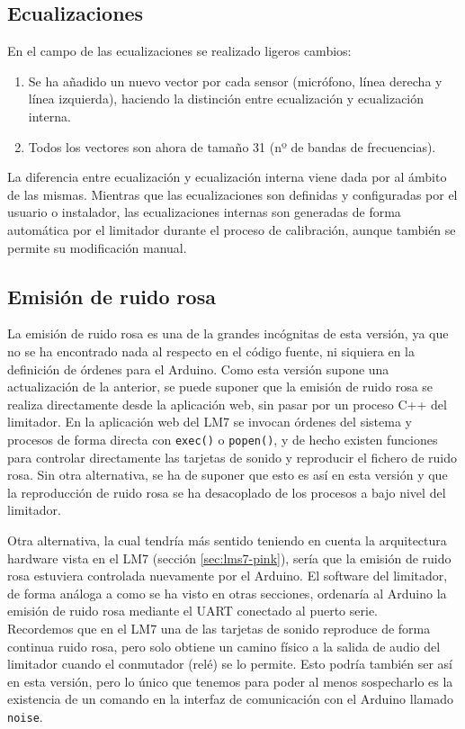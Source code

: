 \subsection{Ecualizaciones} \label{sec:lms11-eq}

En el campo de las ecualizaciones se realizado ligeros cambios:
\begin{enumerate}
	\item Se ha añadido un nuevo vector por cada sensor (micrófono, línea derecha y línea izquierda), haciendo la distinción entre ecualización y ecualización interna.

	\item Todos los vectores son ahora de tamaño 31 (nº de bandas de frecuencias).
\end{enumerate}

La diferencia entre ecualización y ecualización interna viene dada por al ámbito de las mismas. Mientras que las ecualizaciones son definidas y configuradas por el usuario o instalador, las ecualizaciones internas son generadas de forma automática por el limitador durante el proceso de calibración, aunque también se permite su modificación manual.

\subsection{Emisión de ruido rosa}

La emisión de ruido rosa es una de la grandes incógnitas de esta versión, ya que no se ha encontrado nada al respecto en el código fuente, ni siquiera en la definición de órdenes para el Arduino. Como esta versión supone una actualización de la anterior, se puede suponer que la emisión de ruido rosa se realiza directamente desde la aplicación web, sin pasar por un proceso C++ del limitador. En la aplicación web del \acrshort{LM7} se invocan órdenes del sistema y procesos de forma directa con \verb|exec()| o \verb|popen()|, y de hecho existen funciones para controlar directamente las tarjetas de sonido y reproducir el fichero de ruido rosa. Sin otra alternativa, se ha de suponer que esto es así en esta versión y que la reproducción de ruido rosa se ha desacoplado de los procesos a bajo nivel del limitador.

Otra alternativa, la cual tendría más sentido teniendo en cuenta la arquitectura hardware vista en el \acrshort{LM7} (sección \ref{sec:lms7-pink}), sería que la emisión de ruido rosa estuviera controlada nuevamente por el Arduino. El software del limitador, de forma análoga a como se ha visto en otras secciones, ordenaría al Arduino la emisión de ruido rosa mediante el \acrshort{UART} conectado al puerto serie. \\
Recordemos que en el \acrshort{LM7} una de las tarjetas de sonido reproduce de forma continua ruido rosa, pero solo obtiene un camino físico a la salida de audio del limitador cuando el conmutador (relé) se lo permite. Esto podría también ser así en esta versión, pero lo único que tenemos para poder al menos sospecharlo es la existencia de un comando en la interfaz de comunicación con el Arduino llamado \verb|noise|.

